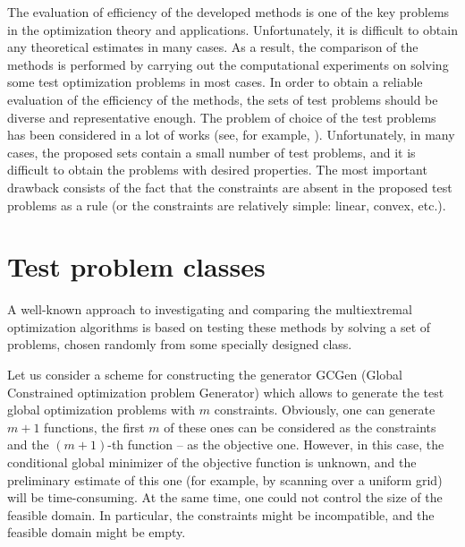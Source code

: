\documentclass{aip-cp}
\begin{document}
The evaluation of efficiency of the developed methods is one of the key problems in the optimization theory and applications. Unfortunately, it is difficult to obtain any theoretical estimates in many cases. As a result, the comparison of the methods is performed by carrying out the computational experiments on solving some test optimization problems in most cases. In order to obtain a reliable evaluation of the efficiency of the methods, the sets of test problems should be diverse and representative enough. The problem of choice of the test problems has been considered in a lot of works (see, for example, \cite{Floudas1999,Gaviano2003,Ali2005,Addis2007}). Unfortunately, in many cases, the proposed sets contain a small number of test problems, and it is difficult to obtain the problems with desired properties. The most important drawback consists of the fact that the constraints are absent in the proposed test problems as a rule (or the constraints are relatively simple: linear, convex, etc.).



\section{Test problem classes}
A well-known approach to investigating and comparing the multiextremal optimization algorithms is based on testing these methods by solving a set of problems, chosen randomly from some specially designed class. 


Let us consider a scheme for constructing the generator GCGen (Global Constrained optimization problem Generator) which allows to generate the test global optimization problems with $m$ constraints. Obviously, one can generate $m+1$ functions, the first $m$ of these ones can be considered as the constraints and the $(m+1)$-th function -- as the objective one. However, in this case, the conditional global minimizer of the objective function is unknown, and the preliminary estimate of this one (for example, by scanning over a uniform grid) will be time-consuming. At the same time, one could not control the size of the feasible domain. In particular, the constraints might be incompatible, and the feasible domain might be empty. 
\end{document}
